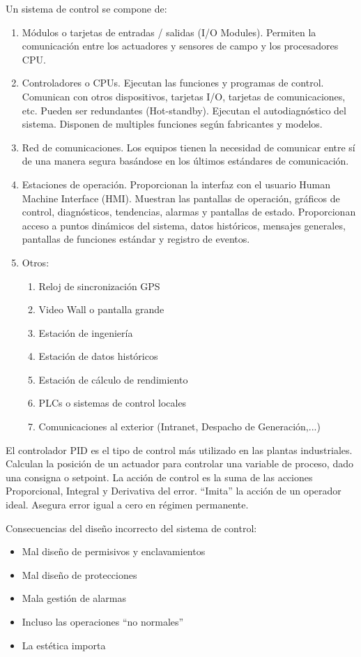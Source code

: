 Un sistema de control se compone de:
\begin{enumerate}
    \item Módulos o tarjetas de entradas / salidas (I/O Modules).
    Permiten la comunicación entre los actuadores y sensores de campo y los procesadores CPU.
    \item Controladores o CPUs.
    Ejecutan las funciones y programas de control. Comunican con otros dispositivos, tarjetas I/O, tarjetas de comunicaciones, etc. Pueden ser redundantes (Hot-standby). Ejecutan el autodiagnóstico del sistema. Disponen de multiples funciones según fabricantes y modelos.
    \item Red de comunicaciones.
    Los equipos tienen la necesidad de comunicar entre sí de una manera segura basándose en los últimos estándares de comunicación.
    \item Estaciones de operación.
    Proporcionan la interfaz con el usuario Human Machine Interface (HMI). Muestran las pantallas de operación, gráficos de control, diagnósticos, tendencias, alarmas y pantallas de estado. Proporcionan acceso a puntos dinámicos del sistema, datos históricos, mensajes generales, pantallas de funciones estándar y registro de eventos.
    \item Otros:
    \begin{enumerate}
        \item Reloj de sincronización GPS
        \item Video Wall o pantalla grande
        \item Estación de ingeniería
        \item Estación de datos históricos
        \item Estación de cálculo de rendimiento
        \item PLCs o sistemas de control locales
        \item Comunicaciones al exterior (Intranet, Despacho de Generación,...)
    \end{enumerate}
\end{enumerate}

El controlador PID es el tipo de control más utilizado en las plantas industriales. Calculan la posición de un actuador para controlar una variable de proceso, dado una consigna o setpoint. La acción de control es la suma de las acciones Proporcional, Integral y Derivativa del error. ``Imita'' la acción de un operador ideal. Asegura error igual a cero en régimen permanente.

Consecuencias del diseño incorrecto del sistema de control:
\begin{itemize}
    \item Mal diseño de permisivos y enclavamientos
    \item Mal diseño de protecciones
    \item Mala gestión de alarmas
    \item Incluso las operaciones ``no normales''
    \item La estética importa
\end{itemize}


